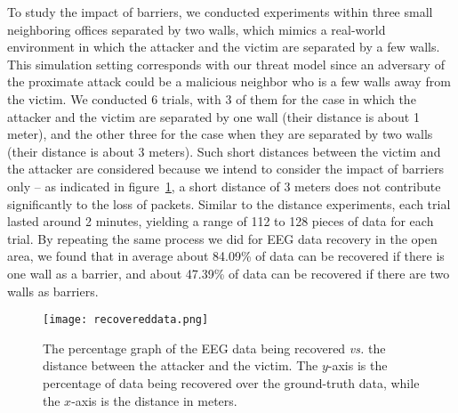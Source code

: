\indent
To study the impact of barriers, we conducted experiments within three small neighboring offices separated by two walls, which mimics a real-world environment in which the attacker and the victim are separated by a few walls. This simulation setting corresponds with our threat model since an adversary of the proximate attack could be a malicious neighbor who is a few walls away from the victim. We conducted 6 trials, with 3 of them for the case in which the attacker and the victim are separated by one wall (their distance is about 1 meter), and the other three for the case when they are separated by two walls (their distance is about 3 meters). Such short distances between the victim and the attacker are considered because we intend to consider the impact of barriers only -- as indicated in figure~\ref{fig:recovereddata}, a short distance of 3 meters does not contribute significantly to the loss of packets. Similar to the distance experiments, each trial lasted around 2 minutes, yielding a range of 112 to 128 pieces of data for each trial. By repeating the same process we did for EEG data recovery in the open area, we found that in average about 84.09\% of data can be recovered if there is one wall as a barrier, and about 47.39\% of data can be recovered if there are two walls as barriers.

\begin{figure}[!htb]
        \centering
        \texttt{[image: recovereddata.png]}
        \caption{The percentage graph of the EEG data being recovered \emph{vs.} the distance between the attacker and the victim. The $y$-axis is the percentage of data being recovered over the ground-truth data, while the $x$-axis is the distance in meters. %
        }
        \label{fig:recovereddata}
\end{figure}

